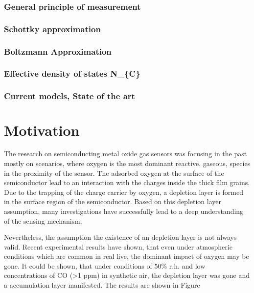 \documentclass[11pt]{article}
\begin{document}
\hypertarget{general-principle-of-measurement}{%
\subsubsection{General principle of
measurement}\label{general-principle-of-measurement}}

\hypertarget{schottky-approximation}{%
\subsubsection{Schottky approximation}\label{schottky-approximation}}

\hypertarget{boltzmann-approximation}{%
\subsubsection{Boltzmann Approximation}\label{boltzmann-approximation}}

\hypertarget{effective-density-of-states-n_c}{%
\subsubsection{Effective density of states
N\_\{C\}}\label{effective-density-of-states-n_c}}

\hypertarget{current-models-state-of-the-art}{%
\subsubsection{Current models, State of the
art}\label{current-models-state-of-the-art}}

    \hypertarget{motivation}{%
\section{Motivation}\label{motivation}}

The research on semiconducting metal oxide gas sensors was focusing in
the past mostly on scenarios, where oxygen is the most dominant
reactive, gaseous, species in the proximity of the sensor. The adsorbed
oxygen at the surface of the semiconductor lead to an interaction with
the charges inside the thick film grains. Due to the trapping of the
charge carrier by oxygen, a depletion layer is formed in the surface
region of the semiconductor. Based on this depletion layer assumption,
many investigations have successfully lead to a deep understanding of
the sensing mechanism.

Nevertheless, the assumption the existence of an depletion layer is not
always valid. Recent experimental results have shown, that even under
atmospheric conditions which are common in real live, the dominant
impact of oxygen may be gone. It could be shown, that under conditions
of 50\% r.h. and low concentrations of CO (\textgreater1 ppm) in
synthetic air, the depletion layer was gone and a accumulation layer
manifested. The results are shown in Figure
\end{document}
